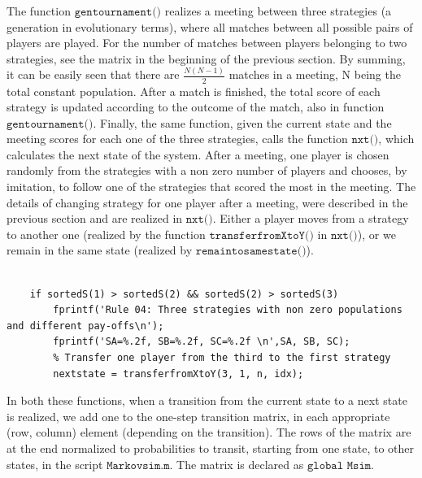 \documentclass[12pt]{article}
\begin{document}
The function $\texttt{gentournament()}$ realizes  a meeting between three strategies (a generation in evolutionary terms), where all matches between all possible pairs of players are played. For the number of matches between players belonging to two strategies, see the matrix in the beginning of the previous section. By summing, it can be easily seen that there are $\frac{N(N-1)}{2}$ matches in a meeting, N being the total constant population. After a match is finished, the total score of each strategy is updated according to the outcome of the match, also in function $\texttt{gentournament()}$. Finally, the same function, given the current state and the meeting scores for each one of the three strategies, calls the function $\texttt{nxt()}$, which calculates the next state of the system. After a meeting, one player is chosen randomly from the strategies with a non zero number of players and chooses, by imitation, to follow one of the strategies that scored the most in the meeting. The details of changing strategy for one player after a meeting, were described in the previous section and are realized in $\texttt{nxt()}$. Either a player moves from a strategy to another one (realized by the function $\texttt{transferfromXtoY()}$ in $\texttt{nxt()}$), or we remain in the same state (realized by $\texttt{remaintosamestate()}$).
\begin{lstlisting}[caption= Abstract example from nxt.m: Three strategies with non-zero populations and the same pay-offs]
    
    if sortedS(1) > sortedS(2) && sortedS(2) > sortedS(3)
        fprintf('Rule 04: Three strategies with non zero populations and different pay-offs\n');
        fprintf('SA=%.2f, SB=%.2f, SC=%.2f \n',SA, SB, SC);
        % Transfer one player from the third to the first strategy
        nextstate = transferfromXtoY(3, 1, n, idx);

\end{lstlisting}
In both these functions, when a transition from the current state to a next state is realized, we add one to the one-step transition matrix, in each appropriate (row, column) element (depending on the transition). The rows of the matrix are at the end normalized to probabilities to transit, starting from one state, to other states, in the script $\texttt{Markovsim.m}$. The matrix is declared as $\texttt{global Msim}$.
\\\\
\end{document}
